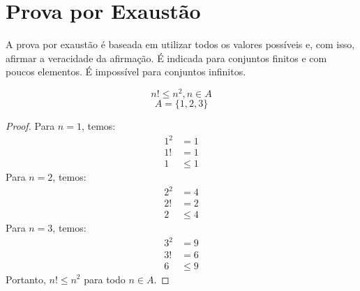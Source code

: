 \section{Prova por Exaustão}
A prova por exaustão é baseada em utilizar todos os valores possíveis e, com isso, afirmar a veracidade da afirmação. É indicada para conjuntos finitos e com poucos elementos. É impossível para conjuntos infinitos. \par 
\begin{exemplo}
\[n! \le n^2, n \in A\]
\[A=\{1,2,3\}\]
\begin{proof}
Para $n=1$, temos:
\begin{align*}
1^2&=1 \\
1!&=1 \\
1 &\le 1
\end{align*}
Para $n=2$, temos:
\begin{align*}
2^2 &= 4 \\
2! &= 2 \\
2 &\le 4
\end{align*}
Para $n=3$, temos:
\begin{align*}
3^2&=9\\
3!&=6\\
6 &\le 9
\end{align*}
Portanto, $n! \le n^2$ para todo $n \in A$.
\end{proof}
\end{exemplo}
